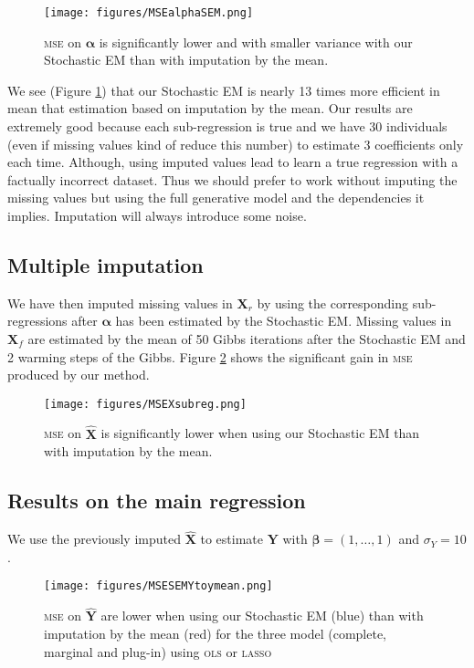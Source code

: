 \documentclass[12pt,a4paper]{report}
\begin{document}
\begin{figure}[h!]
	\centering
	\texttt{[image: figures/MSEalphaSEM.png]} 
	\caption{\textsc{mse} on $\boldsymbol{\alpha}$ is significantly lower and with smaller variance with our Stochastic EM than with imputation by the mean.}\label{MSEalphaSEM}
\end{figure}

	We see (Figure \ref{MSEalphaSEM}) that our Stochastic EM is nearly 13 times more efficient in mean that estimation based on imputation by the mean. Our results are extremely good because each sub-regression is true and we have 30 individuals (even if missing values kind of reduce this number) to estimate 3 coefficients only each time. Although, using imputed values lead to learn a true regression with a factually incorrect dataset. Thus we should prefer to work without imputing the missing values but using the full generative model and the dependencies it implies. Imputation will always introduce some noise.

		
			\subsection{Multiple imputation}
			We have then imputed missing values in $\boldsymbol{X}_r$  by using the corresponding sub-regressions after $\boldsymbol{\alpha}$ has been estimated  by the Stochastic EM.
			Missing values in $\boldsymbol{X}_f$ are estimated by the mean of 50 Gibbs iterations after the Stochastic EM and 2 warming steps of the Gibbs. Figure \ref{MSEXsubreg} shows the significant gain in \textsc{mse} produced by our method.
			\begin{figure}[h!]
	\centering
	\texttt{[image: figures/MSEXsubreg.png]} 
	\caption{\textsc{mse} on $\hat{\boldsymbol{X}}$ is significantly lower when using our Stochastic EM than with imputation by the mean.}\label{MSEXsubreg}
\end{figure}  
\FloatBarrier
		\subsection{Results on the main regression}
		We use the previously imputed $\hat{\boldsymbol{X}}$ to estimate $\boldsymbol{Y}$ with $\boldsymbol{\beta}=(1,\dots,1)$ and $\sigma_Y=10$.
			\begin{figure}[h!]
	\centering
	\texttt{[image: figures/MSESEMYtoymean.png]} 
	\caption{\textsc{mse} on $\hat{\boldsymbol{Y}}$ are lower when using our Stochastic EM (blue) than with imputation by the mean (red) for the three model (complete, marginal and plug-in) using \textsc{ols} or \textsc{lasso}}\label{MSESEMYtoymean}
\end{figure}	
\end{document}
